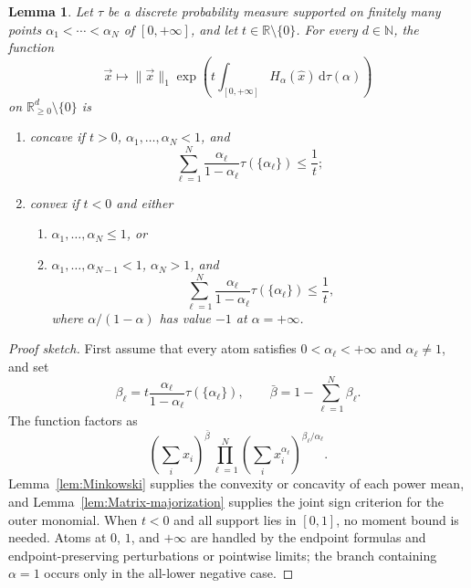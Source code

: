 \documentclass[aps,pra,11pt,onecolumn,nofootinbib,tightenlines]{revtex4-2}
\newtheorem{lemma}[theorem]{Lemma}
\theoremstyle{definition}
\newcommand{\mb}[1]{\mathbb{#1}}
\newcommand{\R}{\mathbb{R}}
\def\d{\mathrm{d}}
\begin{document}
\begin{lemma}
\label{lem:discrete-measure}
Let $\tau$ be a discrete probability measure supported on finitely many points
$\alpha_1<\cdots<\alpha_N$ of $[0,+\infty]$, and let
$t\in\R\setminus\{0\}$.  For every $d\in\mb{N}$, the function
\begin{equation}
\vec{x}\longmapsto\|\vec{x}\|_1
\exp\!\left(t\int_{[0,+\infty]}H_\alpha(\hat{x})\,
\d\tau(\alpha)\right)
\end{equation}
on $\R^d_{\geq0}\setminus\{0\}$ is
\begin{enumerate}
\item concave if $t>0$, $\alpha_1,\ldots,\alpha_N<1$, and
\begin{equation}
\sum_{\ell=1}^N\frac{\alpha_\ell}{1-\alpha_\ell}
\tau(\{\alpha_\ell\})\leq\frac1t;
\end{equation}
\item convex if $t<0$ and either
  \begin{enumerate}[label=(\alph*)]
  \item $\alpha_1,\ldots,\alpha_N\leq1$, or
  \item $\alpha_1,\ldots,\alpha_{N-1}<1$, $\alpha_N>1$, and
  \begin{equation}
  \sum_{\ell=1}^N\frac{\alpha_\ell}{1-\alpha_\ell}
  \tau(\{\alpha_\ell\})\leq\frac1t,
  \end{equation}
  where $\alpha/(1-\alpha)$ has value $-1$ at $\alpha=+\infty$.
  \end{enumerate}
\end{enumerate}
\end{lemma}

\begin{proof}[Proof sketch]
First assume that every atom satisfies
$0<\alpha_\ell<+\infty$ and $\alpha_\ell\neq1$, and set
\begin{equation}
\beta_\ell=t\frac{\alpha_\ell}{1-\alpha_\ell}
\tau(\{\alpha_\ell\}),
\qquad
\bar\beta=1-\sum_{\ell=1}^N\beta_\ell.
\end{equation}
The function factors as
\begin{equation}
\left(\sum_i x_i\right)^{\bar\beta}
\prod_{\ell=1}^N
\left(\sum_i x_i^{\alpha_\ell}\right)^{\beta_\ell/\alpha_\ell}.
\end{equation}
Lemma~\ref{lem:Minkowski} supplies the convexity or concavity of each power mean,
and Lemma~\ref{lem:Matrix-majorization} supplies the joint sign criterion for the
outer monomial.  When $t<0$ and all support lies in $[0,1]$, no moment bound is
needed.  Atoms at $0$, $1$, and $+\infty$ are handled by the endpoint formulas
and endpoint-preserving perturbations or pointwise limits; the branch containing
$\alpha=1$ occurs only in the all-lower negative case.
\end{proof}
\end{document}
